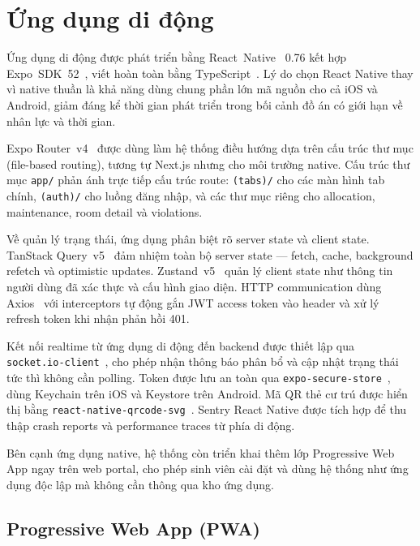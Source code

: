 \documentclass[../DoAn.tex]{subfiles}
\begin{document}
\section{Ứng dụng di động}
\label{sec:mobile}

Ứng dụng di động được phát triển bằng React~Native~\cite{reactnative2024} 0.76
kết hợp Expo~SDK~52~\cite{expo2024router}, viết hoàn toàn bằng
TypeScript~\cite{typescript_docs}. Lý do chọn React Native thay vì native
thuần là khả năng dùng chung phần lớn mã nguồn cho cả iOS và Android, giảm
đáng kể thời gian phát triển trong bối cảnh đồ án có giới hạn về nhân lực và
thời gian.

Expo Router~v4~\cite{expo2024router} được dùng làm hệ thống điều hướng dựa
trên cấu trúc thư mục (file-based routing), tương tự Next.js nhưng cho môi
trường native. Cấu trúc thư mục \texttt{app/} phản ánh trực tiếp cấu trúc
route: \texttt{(tabs)/} cho các màn hình tab chính, \texttt{(auth)/} cho luồng
đăng nhập, và các thư mục riêng cho allocation, maintenance, room detail và
violations.

Về quản lý trạng thái, ứng dụng phân biệt rõ server state và client state.
TanStack Query~v5~\cite{tanstack_query_docs} đảm nhiệm toàn bộ server state ---
fetch, cache, background refetch và optimistic updates. Zustand~v5~\cite{zustand_docs}
quản lý client state như thông tin người dùng đã xác thực và cấu hình giao
diện. HTTP communication dùng Axios~\cite{axios_docs} với interceptors tự động
gắn JWT access token vào header và xử lý refresh token khi nhận phản hồi 401.

Kết nối realtime từ ứng dụng di động đến backend được thiết lập qua
\texttt{socket.io-client}~\cite{socketio2024docs}, cho phép nhận thông báo phân
bổ và cập nhật trạng thái tức thì không cần polling. Token được lưu an toàn qua
\texttt{expo-secure-store}~\cite{expo_secure_store_docs}, dùng Keychain trên iOS
và Keystore trên Android. Mã QR thẻ cư trú được hiển thị bằng
\texttt{react-native-qrcode-svg}~\cite{rn_qrcode_docs}. Sentry React Native
được tích hợp để thu thập crash reports và performance traces từ phía di động.

Bên cạnh ứng dụng native, hệ thống còn triển khai thêm lớp Progressive Web App
ngay trên web portal, cho phép sinh viên cài đặt và dùng hệ thống như ứng dụng
độc lập mà không cần thông qua kho ứng dụng.

\subsection{Progressive Web App (PWA)}
\label{subsec:pwa}
\end{document}
